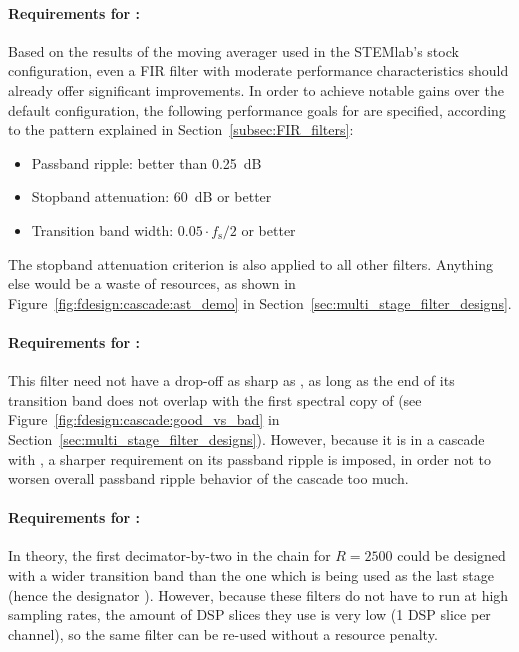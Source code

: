 \paragraph{Requirements  for   :}   Based   on  the   results  of
the  moving  averager   used  in  the  STEMlab's   stock  configuration,  even
a  FIR  filter  with   moderate  performance  characteristics  should  already
offer   significant   improvements. In   order  to   achieve   notable   gains
over  the   default  configuration,   the  following  performance   goals  for
   are  specified,   according  to   the  pattern   explained  in
Section~\ref{subsec:FIR_filters}:
\begin{itemize}\tightlist
    \item
        Passband ripple: better than \SI{0.25}{\dB}
    \item
        Stopband attenuation: \SI{60}{\dB} or better
    \item
        Transition band width: $0.05 \cdot f_\mathrm{s}/2$ or better
\end{itemize}
The     stopband    attenuation     criterion    is     also    applied     to
all    other     filters. Anything    else    would    be     a    waste    of
resources,   as   shown    in   Figure~\ref{fig:fdesign:cascade:ast_demo}   in
Section~\ref{sec:multi_stage_filter_designs}.

\paragraph{Requirements   for  :} This   filter   need  not   have
a   drop-off  as   sharp   as   ,  as   long   as   the  end   of
its   transition   band   does   not   overlap   with   the   first   spectral
copy  of   (see  Figure~\ref{fig:fdesign:cascade:good_vs_bad}  in
Section~\ref{sec:multi_stage_filter_designs}).   However, because  it is  in a
cascade with  , a sharper  requirement on its passband  ripple is
imposed,  in order  not  to worsen  overall passband  ripple  behavior of  the
cascade too much.

\paragraph{Requirements    for    :} In   theory,    the    first
decimator-by-two in  the chain  for $R=2500$  could be  designed with  a wider
transition band than the one which is  being used as the last stage (hence the
designator ). However, because  these filters do not  have to run
at high sampling rates, the amount of DSP slices they use is very low (\num{1}
DSP slice per channel),  so the same filter can be  re-used without a resource
penalty.

